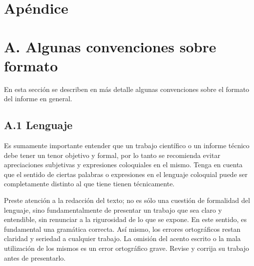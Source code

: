 \documentclass[letterpaper, 10 pt, conference]{ieeeconf}  %
\begin{document}
\addtolength{\textheight}{-12cm}   %







\section*{Ap\'endice}


\section*{A.  Algunas convenciones sobre formato}

En esta secci\'on se describen en m\'as detalle algunas convenciones sobre el formato del informe en general.

\subsection*{A.1     Lenguaje}

Es sumamente importante entender que un trabajo cient\'ifico o un informe t\'ecnico debe tener un tenor objetivo y formal, por lo tanto se recomienda evitar apreciaciones subjetivas y expresiones coloquiales en el mismo. Tenga en cuenta que el sentido de ciertas palabras o expresiones en el lenguaje coloquial puede ser completamente distinto al que tiene tienen t\'ecnicamente. 

Preste atenci\'on a la redacci\'on del texto; no es s\'olo una cuesti\'on de formalidad del lenguaje, sino fundamentalmente de presentar un trabajo que sea claro y entendible, sin renunciar a la rigurosidad de lo que se expone. En este sentido, es fundamental una gram\'atica correcta. As\'i mismo, los errores ortogr\'aficos restan claridad y seriedad a cualquier trabajo. La omisi\'on del acento escrito o la mala utilizaci\'on de los mismos es un error ortogr\'afico grave. Revise y corrija su trabajo antes de presentarlo.
\end{document}
